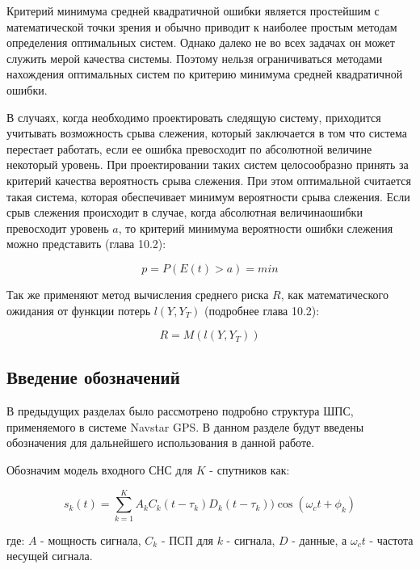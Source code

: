 Критерий минимума средней квадратичной ошибки является простейшим с математической точки зрения и обычно приводит
к наиболее простым методам определения оптимальных систем. Однако далеко не во всех задачах он может служить мерой
качества системы. Поэтому нельзя ограничиваться методами нахождения оптимальных систем по критерию минимума средней
квадратичной ошибки.

В случаях, когда необходимо проектировать следящую систему, приходится учитывать возможность срыва слежения,
который заключается в том что система перестает работать, если ее ошибка превосходит по абсолютной величине некоторый
уровень. При проектировании таких систем целосообразно принять за критерий качества вероятность срыва слежения. При
этом оптимальной считается такая система, которая обеспечивает минимум вероятности срыва слежения. Если срыв слежения
происходит в случае, когда абсолютная величинаошибки превосходит уровень $a$, то критерий минимума вероятности ошибки
слежения можно представить \cite{pugachev} (глава 10.2):
\begin{center}
\begin{equation}
	\label{eq:prob_lost_signal}
	p = P(E(t) > a) = min
\end{equation}
\end{center}

Так же применяют метод вычисления среднего риска $R$, как математического ожидания
от функции потерь $l(Y, Y_T)$ (подробнее \cite{pugachev} глава 10.2):
\begin{center}
\begin{equation}
	\label{eq:prob_lost_func}
	R = M(l(Y, Y_T))
\end{equation}
\end{center}

\subsection{Введение обозначений}
В предыдущих разделах было рассмотрено подробно структура ШПС, применяемого в системе Navstar GPS. В данном разделе
будут введены обозначения для дальнейшего использования в данной работе.

Обозначим модель входного СНС для ${K}$ - спутников как:
\begin{center}
\begin{equation}
	\label{eq:gps_model_1}
	s_k(t) = \sum_{k=1}^{K}{A_{k}C_{k}(t-\tau_k)D_{k}(t-\tau_k))\cos(\omega_{c}t + \phi_k)}
\end{equation}
\end{center}
где: ${A}$ - мощность сигнала, ${C_k}$ - ПСП для ${k}$ - сигнала, ${D}$ - данные, а ${\omega_{c}t}$ - частота несущей сигнала.

